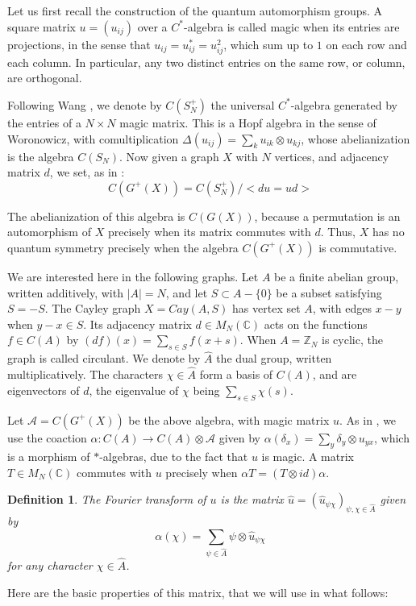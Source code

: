 \documentclass[11pt]{amsart}
\newtheorem{definition}[theorem]{Definition}
\newcommand{\A}{\mathcal A}
\newcommand{\Z}{\mathbb Z}
\newcommand{\CC}{\mathbb C}
\newcommand{\hA}{\widehat A}
\newcommand{\hu}{\widehat u}
\begin{document}
Let us first recall the construction of the quantum automorphism groups. A square matrix $u=(u_{ij})$ over a $C^*$-algebra is called magic when its entries are projections, in the sense that $u_{ij}=u_{ij}^*=u_{ij}^2$, which sum up to $1$ on each row and each column. In particular, any two distinct entries on the same row, or column, are orthogonal.

Following Wang \cite{wan}, we denote by $C(S_N^+)$ the universal $C^*$-algebra generated by the entries of a $N\times N$ magic matrix. This is a Hopf algebra in the sense of Woronowicz, with comultiplication $\Delta(u_{ij})=\sum_ku_{ik}\otimes u_{kj}$, whose abelianization is the algebra $C(S_N)$. Now given a graph $X$ with $N$ vertices, and adjacency matrix $d$, we set, as in \cite{ba2}:
$$C(G^+(X))=C(S_N^+)\Big/\Big<du=ud\Big>$$

The abelianization of this algebra is $C(G(X))$, because a permutation is an automorphism of $X$ precisely when its matrix commutes with $d$. Thus, $X$ has no quantum symmetry precisely when the algebra $C(G^+(X))$ is commutative.

We are interested here in the following graphs. Let $A$ be a finite abelian group, written additively, with $|A|=N$, and let $S\subset A-\{0\}$ be a subset satisfying $S=-S$. The Cayley graph $X=Cay(A,S)$ has vertex set $A$, with edges $x-y$ when $y-x\in S$. Its adjacency matrix $d\in M_N(\CC)$ acts on the functions $f\in C(A)$ by $(df)(x)=\sum_{s\in S}f(x+s)$. When $A=\Z_N$ is cyclic, the graph is called circulant. We denote by $\hA$ the dual group, written multiplicatively. The characters $\chi\in\hA$ form a basis of $C(A)$, and are eigenvectors of $d$, the eigenvalue of $\chi$ being $\sum_{s\in S}\chi(s)$.

Let $\A=C(G^+(X))$ be the above algebra, with magic matrix $u$. As in \cite{bbc}, we use the coaction $\alpha:C(A)\to C(A)\otimes\A$ given by $\alpha(\delta_x)=\sum_y\delta_y\otimes u_{yx}$, which is a morphism of $*$-algebras, due to the fact that $u$ is magic. A matrix $T\in M_N(\CC)$ commutes with $u$ precisely when $\alpha T=(T\otimes id)\alpha$.

\begin{definition}
The Fourier transform of $u$ is the matrix $\hu=(\hu_{\psi\chi})_{\psi,\chi\in\hA}$ given by
$$\alpha(\chi)=\sum_{\psi\in\hA}\psi\otimes\hu_{\psi\chi}$$
for any character $\chi\in\hA$.
\end{definition}

Here are the basic properties of this matrix, that we will use in what follows:
\end{document}

